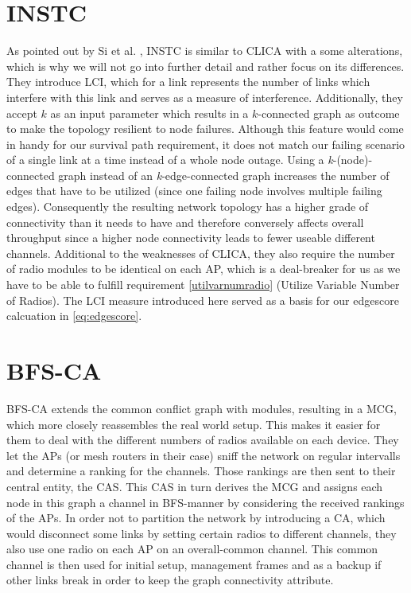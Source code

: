   \section{\ac{INSTC}}
    As pointed out by Si et al. \cite{overview_caa}, \ac{INSTC} \cite{INSTC} is similar to \ac{CLICA} with a some alterations, 
    which is why we will not go into further detail and rather focus on its differences. 
    They introduce \ac{LCI}, which for a link represents the number of links which interfere with this link \cite{overview_caa} and serves as a measure of 
    interference. Additionally, they accept \(k\) as an input parameter which results in a \(k\)-connected graph as outcome to make the topology resilient to node failures.
    Although this feature would come in handy for our survival path requirement, it does not match our failing scenario of a single link at a time instead of a whole node outage.
    Using a \textit{k}-(node)-connected graph instead of an \textit{k}-edge-connected graph increases the number of edges that have to be utilized 
    (since one failing node involves multiple failing edges). Consequently the resulting network topology has a higher grade of connectivity than it needs to 
    have and therefore conversely affects overall throughput since a higher node connectivity leads to fewer useable different channels. 
    Additional to the weaknesses of \ac{CLICA}, they also require the number of radio modules to be identical on each \ac{AP}, 
    which is a deal-breaker for us as we have to be able to fulfill requirement \ref{utilvarnumradio} (Utilize Variable Number of Radios).
    The \ac{LCI} measure introduced here served as a basis for our edgescore calcuation in \ref{eq:edgescore}.
    
  \section{\ac{BFS-CA}}
    \ac{BFS-CA} \cite{BFS-CA} extends the common conflict graph with modules, resulting in a \ac{MCG}, which more closely reassembles the
    real world setup. This makes it easier for them to deal with the different numbers of radios available on each device. 
    They let the APs (or mesh routers in their case) sniff the network on regular intervalls and determine a ranking for the channels.
    Those rankings are then sent to their central entity, the \ac{CAS}. This \ac{CAS} in turn derives the \ac{MCG} and assigns each node in this graph 
    a channel in \ac{BFS}-manner by considering the received rankings of the APs. In order not to partition the network by introducing a \ac{CA}, which 
    would disconnect some links by setting certain radios to different channels, they also use one radio on each AP on an overall-common channel.
    This common channel is then used for initial setup, management frames and as a backup if other links break in order to keep the graph connectivity attribute.
    
